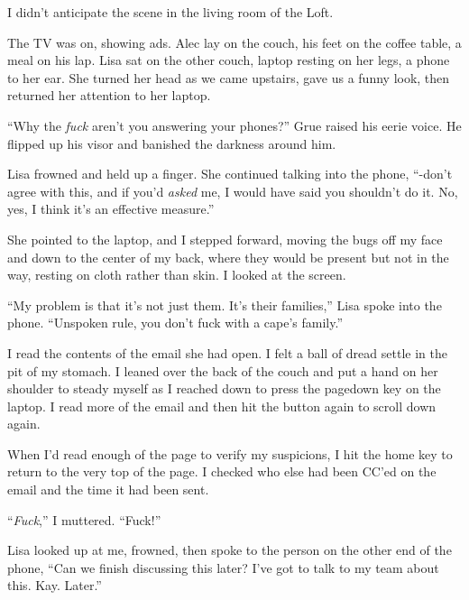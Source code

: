 I didn't anticipate the scene in the living room of the Loft.



The TV was on, showing ads.  Alec lay on the couch, his feet on the coffee table, a meal on his lap.  Lisa sat on the other couch, laptop resting on her legs, a phone to her ear.  She turned her head as we came upstairs, gave us a funny look, then returned her attention to her laptop.



``Why the \emph{fuck} aren't you answering your phones?'' Grue raised his eerie voice.  He flipped up his visor and banished the darkness around him.



Lisa frowned and held up a finger.  She continued talking into the phone, ``-don't agree with this, and if you'd \emph{asked} me, I would have said you shouldn't do it.  No, yes, I think it's an effective measure.''



She pointed to the laptop, and I stepped forward, moving the bugs off my face and down to the center of my back, where they would be present but not in the way, resting on cloth rather than skin.  I looked at the screen.



``My problem is that it's not just them.  It's their families,'' Lisa spoke into the phone.  ``Unspoken rule, you don't fuck with a cape's family.''



I read the contents of the email she had open.  I felt a ball of dread settle in the pit of my stomach.  I leaned over the back of the couch and put a hand on her shoulder to steady myself as I reached down to press the pagedown key on the laptop.  I read more of the email and then hit the button again to scroll down again.



When I'd read enough of the page to verify my suspicions, I hit the home key to return to the very top of the page.  I checked who else had been CC'ed on the email and the time it had been sent.



``\emph{Fuck},'' I muttered.  ``Fuck!''



Lisa looked up at me, frowned, then spoke to the person on the other end of the phone, ``Can we finish discussing this later?  I've got to talk to my team about this.  Kay.  Later.''



